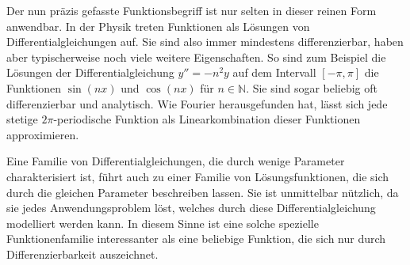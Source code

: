 Der nun präzis gefasste Funktionsbegriff ist nur selten in dieser
reinen Form anwendbar.
In der Physik treten Funktionen als Lösungen von Differentialgleichungen
auf. 
Sie sind also immer mindestens differenzierbar, haben aber typischerweise
noch viele weitere Eigenschaften.
So sind zum Beispiel die Lösungen der Differentialgleichung
$y''=-n^2 y$ auf dem Intervall $[-\pi,\pi]$ die Funktionen
$\sin(nx)$ und $\cos(nx)$ für $n\in\mathbb{N}$.
Sie sind sogar beliebig oft differenzierbar und analytisch.
Wie Fourier herausgefunden hat, lässt sich jede stetige $2\pi$-periodische 
Funktion als Linearkombination dieser Funktionen approximieren.

Eine Familie von Differentialgleichungen, die durch wenige Parameter
charakterisiert ist, führt auch zu einer Familie von Lösungsfunktionen, die
sich durch die gleichen Parameter beschreiben lassen.
Sie ist unmittelbar nützlich, da sie jedes Anwendungsproblem löst,
welches durch diese Differentialgleichung modelliert werden kann.
In diesem Sinne ist eine solche spezielle Funktionenfamilie interessanter
als eine beliebige Funktion, die sich nur durch Differenzierbarkeit 
auszeichnet.

